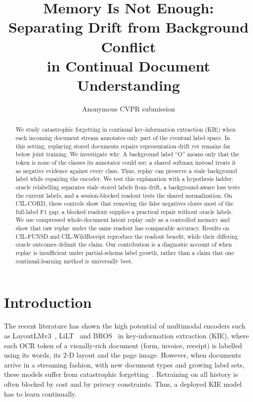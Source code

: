 \documentclass[10pt,twocolumn,letterpaper]{article}
\title{Memory Is Not Enough: Separating Drift from Background Conflict\\in Continual Document Understanding}
\author{Anonymous CVPR submission}
\begin{document}
\maketitle

\begin{abstract}
We study catastrophic forgetting in continual key-information extraction (KIE) when each incoming document stream annotates only part of the eventual label space. In this setting, replaying stored documents repairs representation drift yet remains far below joint training. We investigate why. A background label ``O'' means only that the token is none of the classes its annotator could see; a shared softmax instead treats it as negative evidence against every class. Thus, replay can preserve a stale background label while repairing the encoder. We test this explanation with a hypothesis ladder: oracle relabelling separates stale stored labels from drift, a background-aware loss tests the current labels, and a session-blocked readout tests the shared normalization. On CIL-CORD, these controls show that removing the false negatives closes most of the full-label F1 gap; a blocked readout supplies a practical repair without oracle labels. We use compressed whole-document latent replay only as a controlled memory and show that raw replay under the same readout has comparable accuracy. Results on CIL-FUNSD and CIL-WildReceipt reproduce the readout benefit, while their differing oracle outcomes delimit the claim. Our contribution is a diagnostic account of when replay is insufficient under partial-schema label growth, rather than a claim that one continual-learning method is universally best.
\end{abstract}

\section{Introduction}
\label{sec:intro}

The recent literature has shown the high potential of multimodal encoders such as LayoutLMv3~\citep{huang2022layoutlmv3}, LiLT~\citep{wang2022lilt} and BROS~\citep{hong2022bros} in key-information extraction (KIE), where each OCR token of a visually-rich document (form, invoice, receipt) is labelled using its words, its 2-D layout and the page image. However, when documents arrive in a streaming fashion, with new document types and growing label sets, these models suffer from catastrophic forgetting~\citep{mccloskey1989catastrophic}. Retraining on all history is often blocked by cost and by privacy constraints. Thus, a deployed KIE model has to learn continually.
\end{document}
